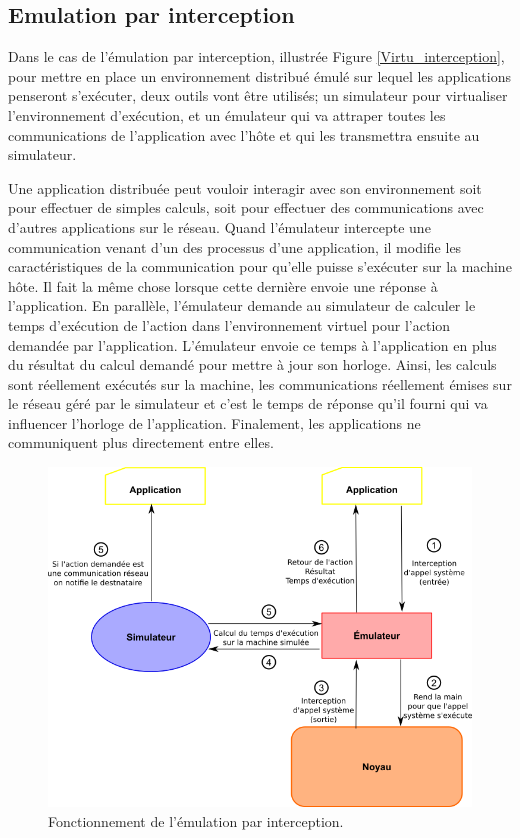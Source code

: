 \subsection{Emulation par interception}
\label{section:interception}

Dans le cas de l'émulation par interception, illustrée
Figure \ref{Virtu_interception}, pour mettre en place un environnement distribué
émulé sur lequel les applications penseront s'exécuter, deux outils vont être
utilisés; un simulateur pour virtualiser l'environnement d'exécution, et un
émulateur qui va attraper toutes les communications de l'application avec l'hôte
et qui les transmettra ensuite au simulateur.

 Une application distribuée peut vouloir interagir avec son environnement soit
 pour effectuer de simples calculs, soit pour effectuer des communications avec
 d'autres applications sur le réseau. Quand l'émulateur intercepte une
 communication venant d'un des processus d'une application, il modifie les
 caractéristiques de la communication pour qu'elle puisse s'exécuter sur la
 machine hôte. Il fait la même chose lorsque cette dernière envoie une réponse à
 l'application. En parallèle, l'émulateur demande au simulateur de calculer le
 temps d'exécution de l'action dans l'environnement virtuel pour l'action
 demandée par l'application. L'émulateur envoie ce temps à l'application en plus
 du résultat du calcul demandé pour mettre à jour son horloge. Ainsi, les
 calculs sont réellement exécutés sur la machine, les communications réellement
 émises sur le réseau géré par le simulateur et c'est le temps de réponse qu'il
 fourni qui va influencer l'horloge de l'application. Finalement, les
 applications ne communiquent plus directement entre elles.

 \begin{figure}
   \centering \includegraphics[scale=0.5]{Pictures/png/Emulation_fonctionnement}
   \caption{Fonctionnement de l'émulation par interception.}
   \label{INTERCEPTION}
 \end{figure}
 
